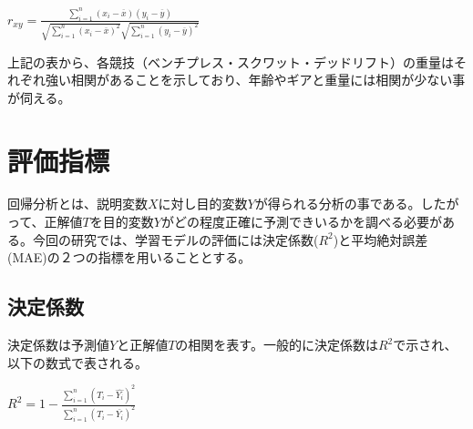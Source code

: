 \documentclass{article}
\begin{document}
\begin{center}
\begin{math}
r_{xy} = \frac{\displaystyle \sum_{i = 1}^n (x_i - \overline{x})
(y_i - \overline{y})}{\sqrt{\displaystyle \sum_{i = 1}^n 
(x_i - \overline{x})^2}\sqrt{\displaystyle \sum_{i = 1}^n 
(y_i - \overline{y})^2}}
\end{math}
\end{center}

上記の表から、各競技（ベンチプレス・スクワット・デッドリフト）の重量はそれぞれ強い相関があることを示しており、年齢やギアと重量には相関が少ない事が伺える。

\section{評価指標}

回帰分析とは、説明変数\begin{math}X\end{math}に対し目的変数\begin{math}Y\end{math}が得られる分析の事である。したがって、正解値\begin{math}T\end{math}を目的変数\begin{math}Y\end{math}がどの程度正確に予測できいるかを調べる必要がある。今回の研究では、学習モデルの評価には決定係数(\begin{math}R^2\end{math})と平均絶対誤差(MAE)の２つの指標を用いることとする。

\subsection{決定係数}

決定係数は予測値\begin{math}Y\end{math}と正解値\begin{math}T\end{math}の相関を表す。一般的に決定係数は\begin{math}R^2\end{math}で示され、以下の数式で表される。

\begin{center}
\begin{math}R^2=1-\frac{\sum_{i=1}^{n}(T_i-\hat{Y_i})^2}{\sum_{i=1}^{n}(T_i-\bar{Y_i})^2}\end{math}
\end{center}
\end{document}

